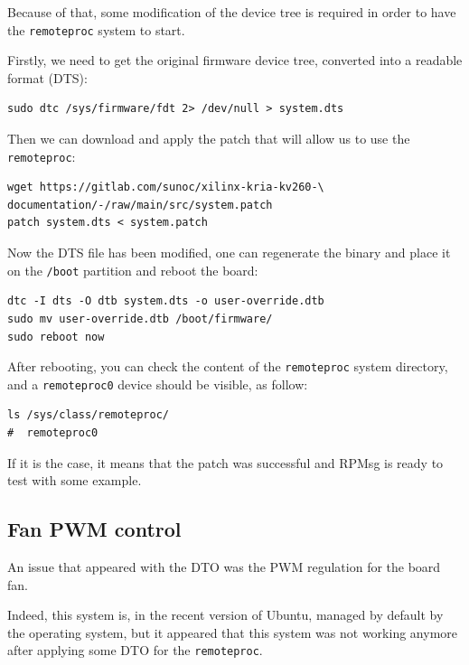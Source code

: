 \documentclass[10pt]{article}
\begin{document}
Because of that, some modification of the device tree is required in order to have
the \verb|remoteproc| system to start.

Firstly, we need to get the original firmware device tree, converted
into a readable format (DTS):
\begin{tcolorbox}
\begin{verbatim}
sudo dtc /sys/firmware/fdt 2> /dev/null > system.dts
\end{verbatim}
\end{tcolorbox}

Then we can download and apply the patch that will allow us to use the \verb|remoteproc|:
\begin{tcolorbox}
\begin{verbatim}
wget https://gitlab.com/sunoc/xilinx-kria-kv260-\
documentation/-/raw/main/src/system.patch
patch system.dts < system.patch
\end{verbatim}
\end{tcolorbox}

Now the DTS file has been modified, one can regenerate the binary and place it on the \verb|/boot| partition
and reboot the board:
\begin{tcolorbox}
\begin{verbatim}
dtc -I dts -O dtb system.dts -o user-override.dtb
sudo mv user-override.dtb /boot/firmware/
sudo reboot now
\end{verbatim}
\end{tcolorbox}

After rebooting, you can check the content of the \verb|remoteproc| system directory,
and a \verb|remoteproc0| device should be visible, as follow:
\begin{tcolorbox}
\begin{verbatim}
ls /sys/class/remoteproc/
#  remoteproc0
\end{verbatim}
\end{tcolorbox}

If it is the case, it means that the patch was successful and RPMsg is
ready to test with some example.

\subsection{Fan PWM control}
\label{sec:fan-pwm-control}
An issue that appeared with the DTO was the PWM regulation for the board fan.

Indeed, this system is, in the recent version of Ubuntu, managed by default
by the operating system, but it appeared that this system was not working anymore
after applying some DTO for the \verb|remoteproc|.
\end{document}
